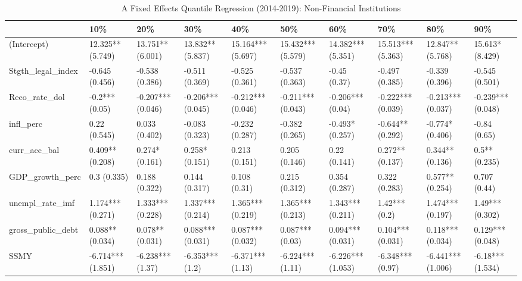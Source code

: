 \begin{table}[ht]
\centering
\caption{A Fixed Effects Quantile Regression (2014-2019): Non-Financial Institutions} 
\begingroup\small
\begin{tabular}{llllllllll}
  \toprule
 & 10\% & 20\% & 30\% & 40\% & 50\% & 60\% & 70\% & 80\% & 90\% \\ 
  \midrule
(Intercept) & 12.325** (5.749) & 13.751** (6.001) & 13.832** (5.837) & 15.164*** (5.697) & 15.432*** (5.579) & 14.382*** (5.351) & 15.513*** (5.363) & 12.847** (5.768) & 15.613* (8.429) \\ 
  Stgth\_legal\_index & -0.645 (0.456) & -0.538 (0.386) & -0.511 (0.369) & -0.525 (0.361) & -0.537 (0.363) & -0.45 (0.37) & -0.497 (0.385) & -0.339 (0.396) & -0.545 (0.501) \\ 
  Reco\_rate\_dol & -0.2*** (0.05) & -0.207*** (0.046) & -0.206*** (0.045) & -0.212*** (0.046) & -0.211*** (0.043) & -0.206*** (0.04) & -0.222*** (0.039) & -0.213*** (0.037) & -0.239*** (0.048) \\ 
  infl\_perc & 0.22 (0.545) & 0.033 (0.402) & -0.083 (0.323) & -0.232 (0.287) & -0.382 (0.265) & -0.493* (0.257) & -0.644** (0.292) & -0.774* (0.406) & -0.84 (0.65) \\ 
  curr\_acc\_bal & 0.409** (0.208) & 0.274* (0.161) & 0.258* (0.151) & 0.213 (0.151) & 0.205 (0.146) & 0.22 (0.141) & 0.272** (0.137) & 0.344** (0.136) & 0.5** (0.235) \\ 
  GDP\_growth\_perc & 0.3 (0.335) & 0.188 (0.322) & 0.144 (0.317) & 0.108 (0.31) & 0.215 (0.312) & 0.354 (0.287) & 0.322 (0.283) & 0.577** (0.254) & 0.707 (0.44) \\ 
  unempl\_rate\_imf & 1.174*** (0.271) & 1.333*** (0.228) & 1.337*** (0.214) & 1.365*** (0.219) & 1.365*** (0.213) & 1.343*** (0.211) & 1.42*** (0.2) & 1.474*** (0.197) & 1.49*** (0.302) \\ 
  gross\_public\_debt & 0.088** (0.034) & 0.078** (0.031) & 0.088*** (0.031) & 0.087*** (0.032) & 0.087*** (0.03) & 0.094*** (0.031) & 0.104*** (0.031) & 0.118*** (0.034) & 0.129*** (0.048) \\ 
  SSMY & -6.714*** (1.851) & -6.238*** (1.37) & -6.353*** (1.2) & -6.371*** (1.13) & -6.224*** (1.11) & -6.226*** (1.053) & -6.348*** (0.97) & -6.441*** (1.006) & -6.18*** (1.534) \\ 
   \bottomrule
\end{tabular}
\endgroup
\end{table}
